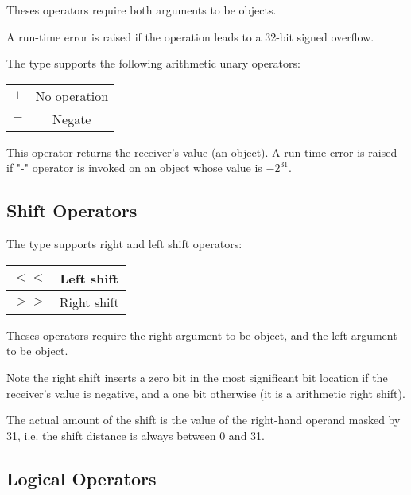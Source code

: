 Theses operators require both arguments to be  objects.\newline

A run-time error is raised if the operation leads to a 32-bit signed overflow.

The  type supports the following arithmetic unary operators:\newline

\begin{tabular}{|c|c|}
\hline
$+$ & No operation \\
$-$ & Negate \\
\hline
\end{tabular}\newline

This operator returns the receiver's value (an  object). A run-time error is raised if "-" operator is invoked on an object whose value is $-2^{31}$.






\subsection{Shift Operators}


The  type supports right and left shift operators:\newline

\begin{tabular}{|c|c|}
\hline
$<<$ & Left shift \\
\hline
$>>$ & Right shift \\
\hline
\end{tabular}\newline

Theses operators require the right argument to be  object, and the left argument to be  object.\newline

Note the right shift inserts a zero bit in the most significant bit location if the receiver's value is negative, and a one bit otherwise (it is a arithmetic right shift).\newline

The actual amount of the shift is the value of the right-hand operand masked by 31, i.e. the shift distance is always between 0 and 31.




\subsection{Logical Operators}

